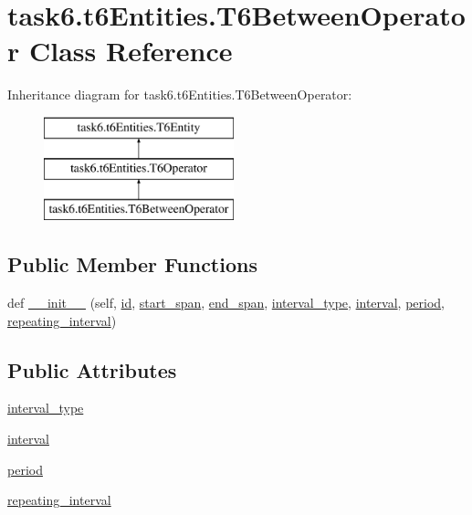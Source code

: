 \hypertarget{classtask6_1_1t6Entities_1_1T6BetweenOperator}{}\section{task6.\+t6\+Entities.\+T6\+Between\+Operator Class Reference}
\label{classtask6_1_1t6Entities_1_1T6BetweenOperator}
Inheritance diagram for task6.\+t6\+Entities.\+T6\+Between\+Operator\+:\begin{figure}[H]
\begin{center}
\leavevmode
\includegraphics[height=3.000000cm]{classtask6_1_1t6Entities_1_1T6BetweenOperator}
\end{center}
\end{figure}
\subsection*{Public Member Functions}
\begin{DoxyCompactItemize}
\item 
def \hyperlink{classtask6_1_1t6Entities_1_1T6BetweenOperator_a5f14461e7680898e99d0ffae4e7cabf3}{\+\_\+\+\_\+init\+\_\+\+\_\+} (self, \hyperlink{classtask6_1_1t6Entities_1_1T6Entity_afeeced8134bb3ebe0cfecc64d0ab46a4}{id}, \hyperlink{classtask6_1_1t6Entities_1_1T6Entity_a52779e9af8864dc98e8b02fc5b9b041a}{start\+\_\+span}, \hyperlink{classtask6_1_1t6Entities_1_1T6Entity_aeb402200b156cd9562c5111dfe777b98}{end\+\_\+span}, \hyperlink{classtask6_1_1t6Entities_1_1T6BetweenOperator_a35cf4635c9e2556637c8943ef997c1f5}{interval\+\_\+type}, \hyperlink{classtask6_1_1t6Entities_1_1T6BetweenOperator_a9eb5c4526dd584bd2390d9b864098869}{interval}, \hyperlink{classtask6_1_1t6Entities_1_1T6BetweenOperator_a764d758517da34169e3b313f7d6a2789}{period}, \hyperlink{classtask6_1_1t6Entities_1_1T6BetweenOperator_a43793dba1ed7f6ee2c940f79559d5eaf}{repeating\+\_\+interval})
\end{DoxyCompactItemize}
\subsection*{Public Attributes}
\begin{DoxyCompactItemize}
\item 
\hyperlink{classtask6_1_1t6Entities_1_1T6BetweenOperator_a35cf4635c9e2556637c8943ef997c1f5}{interval\+\_\+type}
\item 
\hyperlink{classtask6_1_1t6Entities_1_1T6BetweenOperator_a9eb5c4526dd584bd2390d9b864098869}{interval}
\item 
\hyperlink{classtask6_1_1t6Entities_1_1T6BetweenOperator_a764d758517da34169e3b313f7d6a2789}{period}
\item 
\hyperlink{classtask6_1_1t6Entities_1_1T6BetweenOperator_a43793dba1ed7f6ee2c940f79559d5eaf}{repeating\+\_\+interval}
\end{DoxyCompactItemize}


